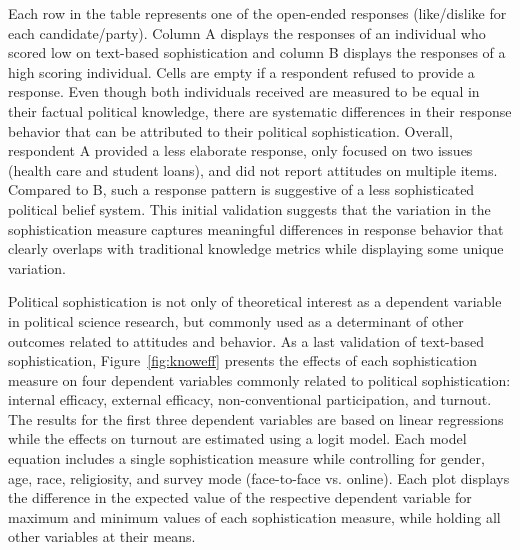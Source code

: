\documentclass[12pt]{article}
\begin{document}
Each row in the table represents one of the open-ended responses (like/dislike for each candidate/party). Column A displays the responses of an individual who scored low on text-based sophistication and column B displays the responses of a high scoring individual. Cells are empty if a respondent refused to provide a response. Even though both individuals received are measured to be equal in their factual political knowledge, there are systematic differences in their response behavior that can be attributed to their political sophistication. Overall, respondent A provided a less elaborate response, only focused on two issues (health care and student loans), and did not report attitudes on multiple items. Compared to B, such a response pattern is suggestive of a less sophisticated political belief system. This initial validation suggests that the variation in the sophistication measure captures meaningful differences in response behavior that clearly overlaps with traditional knowledge metrics while displaying some unique variation.

Political sophistication is not only of theoretical interest as a dependent variable in political science research, but commonly used as a determinant of other outcomes related to attitudes and behavior. As a last validation of text-based sophistication, Figure~\ref{fig:knoweff} presents the effects of each sophistication measure on four dependent variables commonly related to political sophistication: internal efficacy, external efficacy, non-conventional participation, and turnout. The results for the first three dependent variables are based on linear regressions while the effects on turnout are estimated using a logit model. Each model equation includes a single sophistication measure while controlling for gender, age, race, religiosity, and survey mode (face-to-face vs. online). Each plot displays the difference in the expected value of the respective dependent variable for maximum and minimum values of each sophistication measure, while holding all other variables at their means.
\end{document}
